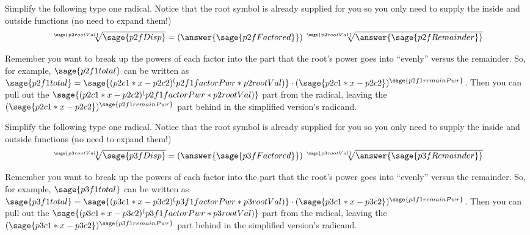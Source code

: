 \documentclass{ximera}
\begin{document}
\begin{problem}
    Simplify the following type one radical. Notice that the root symbol is already supplied for you so you only need to supply the inside and outside functions (no need to expand them!)
    \[
        \sqrt[\sage{p2rootVal}]{\sage{p2fDisp}} = \left(\answer{\sage{p2fFactored}}\right)\sqrt[\sage{p2rootVal}]{\answer{\sage{p2fRemainder}}}
    \]
    \begin{feedback}
        Remember you want to break up the powers of each factor into the part that the root's power goes into ``evenly'' versus the remainder. So, for example, $\sage{p2f1total}$ can be written as $\sage{p2f1total} = \sage{(p2c1*x-p2c2)^(p2f1factorPwr*p2rootVal)}\cdot (\sage{p2c1*x-p2c2})^{\sage{p2f1remainPwr}}$. Then you can pull out the $\sage{(p2c1*x-p2c2)^(p2f1factorPwr*p2rootVal)}$ part from the radical, leaving the $(\sage{p2c1*x-p2c2})^{\sage{p2f1remainPwr}}$ part behind in the simplified version's radicand.
    \end{feedback}
\end{problem}


\begin{problem}
    Simplify the following type one radical. Notice that the root symbol is already supplied for you so you only need to supply the inside and outside functions (no need to expand them!)
    \[
        \sqrt[\sage{p3rootVal}]{\sage{p3fDisp}} = \left(\answer{\sage{p3fFactored}}\right)\sqrt[\sage{p3rootVal}]{\answer{\sage{p3fRemainder}}}
    \]
    \begin{feedback}
        Remember you want to break up the powers of each factor into the part that the root's power goes into ``evenly'' versus the remainder. So, for example, $\sage{p3f1total}$ can be written as $\sage{p3f1total} = \sage{(p3c1*x-p3c2)^(p3f1factorPwr*p3rootVal)}\cdot (\sage{p3c1*x-p3c2})^{\sage{p3f1remainPwr}}$. Then you can pull out the $\sage{(p3c1*x-p3c2)^(p3f1factorPwr*p3rootVal)}$ part from the radical, leaving the $(\sage{p3c1*x-p3c2})^{\sage{p3f1remainPwr}}$ part behind in the simplified version's radicand.
    \end{feedback}
\end{problem}
\end{document}
